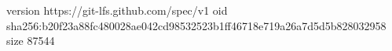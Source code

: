 version https://git-lfs.github.com/spec/v1
oid sha256:b20f23a88fc480028ae042cd98532523b1ff46718e719a26a7d5d5b828032958
size 87544
